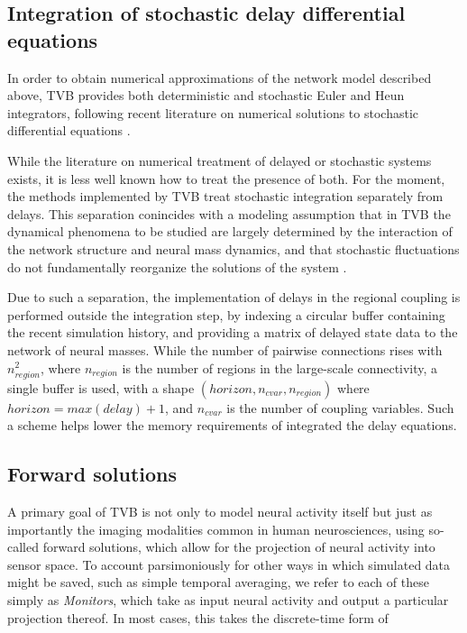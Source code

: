 \subsection{Integration of stochastic delay differential equations}

	In order to obtain numerical approximations of the network model 
	described above, TVB provides both deterministic and stochastic
	Euler and Heun integrators,
	following recent literature on numerical solutions to stochastic
	differential equations \cite{Kloeden_1995,Mannella_2002,Mannella_1989}.

	While the literature on numerical treatment of delayed or 
	stochastic systems exists, it is less well known how to treat 
	the presence of both. For the moment, the methods implemented by TVB
	treat stochastic integration separately from delays. 
	This separation conincides with a modeling assumption that in
	TVB the dynamical phenomena to be studied are largely determined
	by the interaction of the network structure and neural mass dynamics, 
	and that stochastic fluctuations do not fundamentally reorganize the
	solutions of the system \cite{Ghosh_2008,Deco_2009,Deco_2011,Deco_Senden_2012}.

	Due to such a separation, the implementation of delays in the
	regional coupling is performed outside the integration step,
	by indexing a circular buffer containing the recent simulation 
	history, and providing a matrix of delayed state data to the 
	network of neural masses. While the number of pairwise
	connections rises with $n_{region}^2$, where $n_{region}$ is
	the number of regions in the large-scale connectivity, 
	a single buffer is used, with a shape
	$(horizon, n_{cvar}, n_{region})$ where $horizon = max(delay) + 1$,
	and
	$n_{cvar}$ is the number of coupling variables. Such a scheme helps 
	lower the memory requirements of integrated the delay equations.

\subsection{Forward solutions}

	A primary goal of TVB is not only to model neural activity itself
	but just as importantly the imaging modalities common in human 
	neurosciences, using so-called forward solutions, which allow for
	the projection of neural activity into sensor space. To account
	parsimoniously for other ways in which simulated data might be saved, 
	such as simple temporal averaging, we refer to each of these simply as 
	\textit{Monitors}, which take as input neural activity and 
	output a particular projection thereof. In most cases, this 
	takes the discrete-time form of

